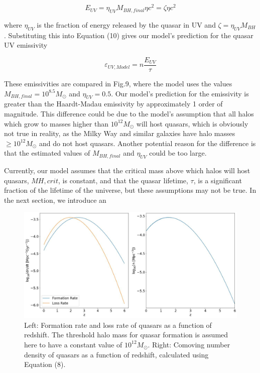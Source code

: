 \documentclass[12pt, twocolumn]{report}%
\begin{document}
\begin{equation}
    E_{UV}=\eta_{UV}M_{BH,final}\eta c^2=\zeta\eta c^2
\end{equation}

\noindent where $\eta_{UV}$ is the fraction of energy released by the quasar in UV and $\zeta=\eta_{UV}M_{BH}$. Substituting this into Equation (10) gives our model's prediction for the quasar UV emissivity

\begin{equation}
    \varepsilon_{UV,Model}=n\frac{E_{UV}}{\tau}
\end{equation}

These emissivities are compared in Fig.9, where the model uses the values $M_{BH,final}=10^{8.5}M_\odot$ and $\eta_{UV}=0.5$. Our model's prediction for the emissivity is greater than the Haardt-Madau emissivity by approximately 1 order of magnitude. This difference could be due to the model's assumption that all halos which grow to masses higher than $10^12M_\odot$ will host quasars, which is obviously not true in reality, as the Milky Way and similar galaxies have halo masses $\geq10^{12}M_\odot$ and do not host quasars. Another potential reason for the difference is that the estimated values of $M_{BH,final}$ and $\eta_{UV}$ could be too large.\par

Currently, our model assumes that the critical mass above which halos will host quasars, $M{H,crit}$, is constant, and that the quasar lifetime, $\tau$, is a significant fraction of the lifetime of the universe, but these assumptions may not be true. In the next section, we introduce an

\clearpage

\onecolumngrid


\begin{figure}[H]
\centering
\includegraphics[width=\linewidth]{Plot_7_2.jpeg}
\caption{Left: Formation rate and loss rate of quasars as a function of redshift. The threshold halo mass for quasar formation is assumed here to have a constant value of $10^{12}M_\odot$. Right: Comoving number density of quasars as a function of redshift, calculated using Equation (8).}
\label{fig:7}
\end{figure}
\end{document}
